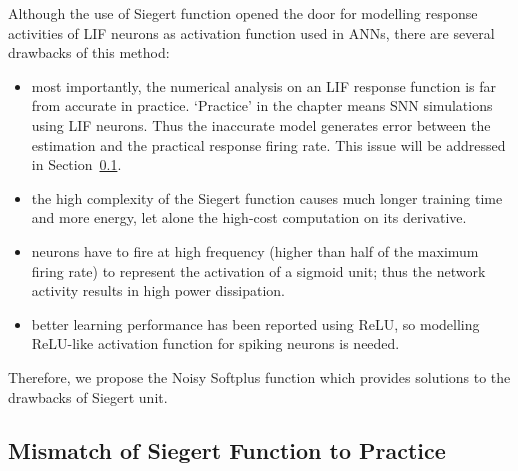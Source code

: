 	Although the use of Siegert function opened the door for modelling response activities of LIF neurons as activation function used in ANNs, there are several drawbacks of this method:
	\begin{itemize}
		\item most importantly, the numerical analysis on an LIF response function is far from accurate in practice. `Practice' in the chapter means SNN simulations using LIF neurons.
		Thus the inaccurate model generates error between the estimation and the practical response firing rate.
		This issue will be addressed in Section~\ref{subsec:practice}.
		
		
		\item the high complexity of the Siegert function causes much longer training time and more energy, let alone the high-cost computation on its derivative.
		\item neurons have to fire at high frequency (higher than half of the maximum firing rate) to represent the activation of a sigmoid unit; thus the network activity results in high power dissipation.
		\item better learning performance has been reported using ReLU, so modelling ReLU-like activation function for spiking neurons is needed.  
	\end{itemize}
	
	Therefore, we propose the Noisy Softplus function which provides solutions to the drawbacks of Siegert unit.
	
	\subsection{Mismatch of Siegert Function to Practice}
	\label{subsec:practice}
	
